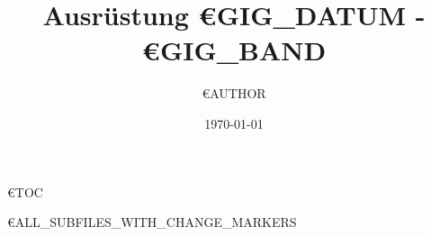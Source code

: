 \documentclass{article}
\title{Ausrüstung €{GIG_DATUM} - €{GIG_BAND}}
\author{€{AUTHOR}}
\date{\today}
\begin{document}
\maketitle

€{TOC}

€{ALL_SUBFILES_WITH_CHANGE_MARKERS}
\end{document}
